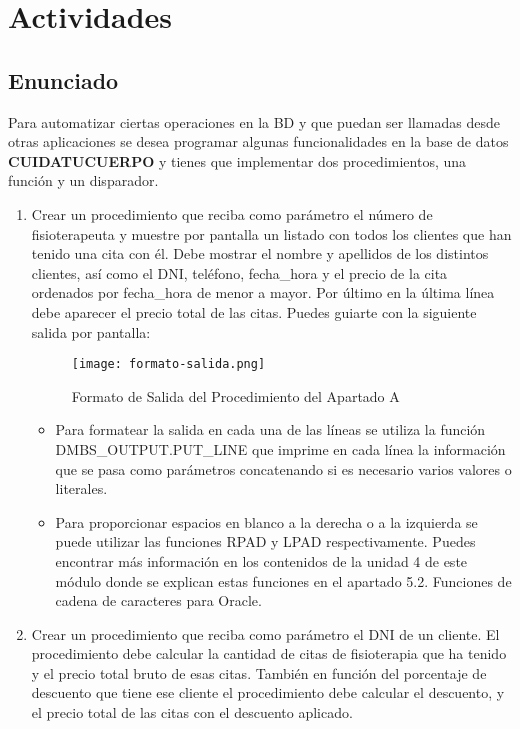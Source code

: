 \section{Actividades}

\subsection{Enunciado}
Para automatizar ciertas operaciones en la BD y que puedan ser llamadas desde otras aplicaciones se desea programar algunas funcionalidades en la base de datos \textbf{CUIDATUCUERPO} y tienes que implementar dos procedimientos, una función y un disparador.

\begin{enumerate}[label=\Alph*)]
    \item Crear un procedimiento que reciba como parámetro el número de fisioterapeuta  y muestre por pantalla un listado con todos los clientes que han tenido una cita con él. Debe mostrar el nombre y apellidos de los distintos clientes, así como el DNI, teléfono, fecha\_hora  y el precio de la cita ordenados por fecha\_hora de menor a mayor. Por último en la última línea debe aparecer el precio total de las citas.  Puedes guiarte con la siguiente salida por pantalla:

    \begin{figure}[H]
        \centering
        \texttt{[image: formato-salida.png]}
        \caption{Formato de Salida del Procedimiento del Apartado A}
    \end{figure}

    \begin{itemize}
        \item Para formatear la salida en cada una de las líneas se utiliza la función DMBS\_OUTPUT.PUT\_LINE que imprime en cada línea la información que se pasa como parámetros concatenando si es necesario varios valores o literales.
        \item Para proporcionar espacios en blanco a la derecha o a la izquierda se puede utilizar las funciones RPAD y LPAD respectivamente. Puedes encontrar más información en los contenidos de la unidad 4 de este módulo donde se explican estas funciones en el apartado 5.2. Funciones de cadena de caracteres para Oracle.
    \end{itemize}

    \item Crear un procedimiento que reciba como parámetro el DNI de un cliente. El procedimiento debe calcular la cantidad de citas de fisioterapia que ha tenido y el precio total bruto de esas citas. También en función del porcentaje de descuento que tiene ese cliente el procedimiento debe calcular el descuento, y  el precio total de las citas con el descuento aplicado.


\end{enumerate}
